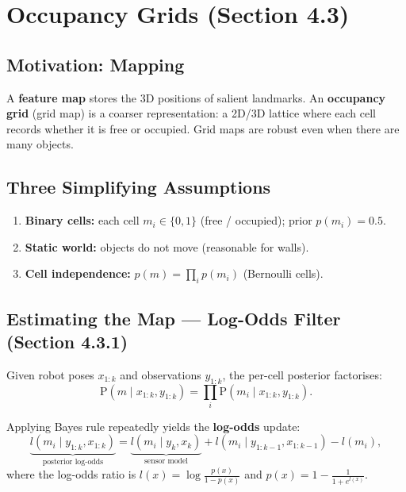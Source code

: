 \documentclass[12pt, a4paper]{article}
\begin{document}
\section{Occupancy Grids (Section 4.3)}

\subsection{Motivation: Mapping}

A \textbf{feature map} stores the 3D positions of salient landmarks.
An \textbf{occupancy grid} (grid map) is a coarser representation: a
2D/3D lattice where each cell records whether it is free or occupied.
Grid maps are robust even when there are many objects.

\subsection{Three Simplifying Assumptions}

\begin{enumerate}
  \item \textbf{Binary cells:} each cell $m_i\in\{0,1\}$ (free / occupied);
    prior $p(m_i)=0.5$.
  \item \textbf{Static world:} objects do not move (reasonable for walls).
  \item \textbf{Cell independence:} $p(m)=\prod_i p(m_i)$ (Bernoulli cells).
\end{enumerate}

\subsection{Estimating the Map --- Log-Odds Filter (Section 4.3.1)}

Given robot poses $x_{1:k}$ and observations $y_{1:k}$, the per-cell
posterior factorises:
\begin{equation}
  \mathrm{P}(m\mid x_{1:k},y_{1:k}) = \prod_i \mathrm{P}(m_i\mid x_{1:k},y_{1:k}).
\end{equation}

Applying Bayes rule repeatedly yields the \textbf{log-odds} update:
\begin{equation}
  \underbrace{l(m_i\mid y_{1:k},x_{1:k})}_{\text{posterior log-odds}}
  = \underbrace{l(m_i\mid y_k,x_k)}_{\text{sensor model}}
  + l(m_i\mid y_{1:k-1},x_{1:k-1})
  - l(m_i),
  \label{eq:log_odds_update}
\end{equation}
where the log-odds ratio is $l(x)=\log\frac{p(x)}{1-p(x)}$ and
$p(x)=1-\frac{1}{1+e^{l(x)}}$.
\end{document}
